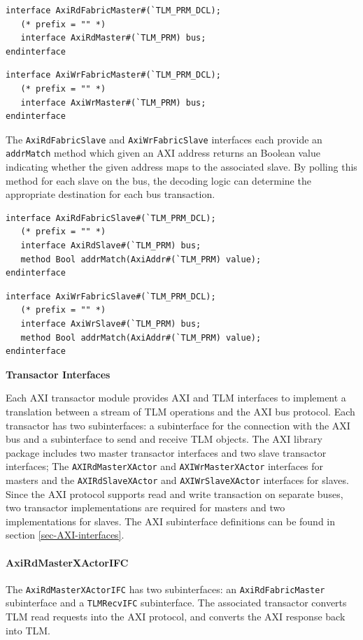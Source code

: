 \documentclass[twoside,letterpaper]{article}
\newcommand{\te}[1]{\texttt{#1}}
\begin{document}
\begin{verbatim}
interface AxiRdFabricMaster#(`TLM_PRM_DCL);
   (* prefix = "" *)
   interface AxiRdMaster#(`TLM_PRM) bus;
endinterface
\end{verbatim}

\begin{verbatim}
interface AxiWrFabricMaster#(`TLM_PRM_DCL);
   (* prefix = "" *)
   interface AxiWrMaster#(`TLM_PRM) bus;
endinterface
\end{verbatim}

The \te{AxiRdFabricSlave} and \te{AxiWrFabricSlave} interfaces each
provide an \te{addrMatch} method which given an AXI address returns
an Boolean value indicating whether the given address maps to the
associated slave. By polling this method for each slave on the bus,
the decoding logic can determine the appropriate destination for each
bus transaction. 

\begin{verbatim}
interface AxiRdFabricSlave#(`TLM_PRM_DCL);
   (* prefix = "" *)
   interface AxiRdSlave#(`TLM_PRM) bus;
   method Bool addrMatch(AxiAddr#(`TLM_PRM) value);
endinterface
\end{verbatim}

\begin{verbatim}
interface AxiWrFabricSlave#(`TLM_PRM_DCL);
   (* prefix = "" *)
   interface AxiWrSlave#(`TLM_PRM) bus;
   method Bool addrMatch(AxiAddr#(`TLM_PRM) value);
endinterface
\end{verbatim}

{\bf Transactor Interfaces}
\label{Axi-transactors}

Each AXI transactor module provides AXI and TLM interfaces to
implement a translation between a stream of TLM operations and the AXI
bus protocol.  Each transactor has two subinterfaces: a subinterface
for the connection with the AXI bus and a subinterface to send and
receive TLM objects.  The AXI library package includes two master
transactor interfaces and two slave transactor interfaces; The
\te{AXIRdMasterXActor} and \te{AXIWrMasterXActor} interfaces for 
masters and the \te{AXIRdSlaveXActor} and \te{AXIWrSlaveXActor}
interfaces for slaves.  Since the AXI protocol supports read and write
transaction on separate buses, two transactor implementations are
required for masters and two implementations for slaves.  The AXI
subinterface definitions can be found in section
\ref{sec-AXI-interfaces}.


\paragraph{\bf AxiRdMasterXActorIFC} The \te{AxiRdMasterXActorIFC} has two subinterfaces: 
an \te{AxiRdFabricMaster} subinterface and a \te{TLMRecvIFC}
subinterface.  The associated transactor converts TLM read requests
into the AXI protocol, and converts the AXI response back into TLM.
\end{document}

